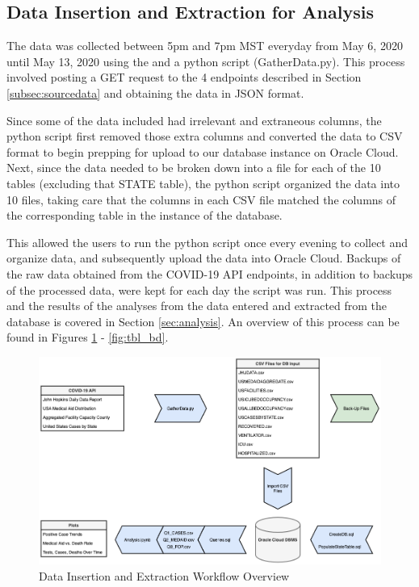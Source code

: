 \documentclass[11pt]{article}
\newcommand{\MYhref}[3][blue]{\href{#2}{\color{#1}{#3}}}%
\begin{document}
\subsection{Data Insertion and Extraction for Analysis}
\label{subsec:insertextract}

\noindent
The data was collected between 5pm and 7pm MST everyday from May 6, 2020 until May 13, 2020 using the \MYhref{https://www.npmjs.com/package/covid19-api}{Covid-19 API} and a python script (GatherData.py). This process involved posting a GET request to the 4 endpoints described in Section \ref{subsec:sourcedata} and obtaining the data in JSON format. 

\noindent
Since some of the data included had irrelevant and extraneous columns, the python script first removed those extra columns and converted the data to CSV format to begin prepping for upload to our database instance on Oracle Cloud. Next, since the data needed to be broken down into a file for each of the 10 tables (excluding that STATE table), the python script organized the data into 10 files, taking care that the columns in each CSV file matched the columns of the corresponding table in the instance of the database.

\noindent
This allowed the users to run the python script once every evening to collect and organize data, and subsequently upload the data into Oracle Cloud. Backups of the raw data obtained from the COVID-19 API endpoints, in addition to backups of the processed data, were kept for each day the script was run. This process and the results of the analyses from the data entered and extracted from the database is covered in Section \ref{sec:analysis}. An overview of this process can be found in Figures \ref{fig:my_label} - \ref{fig:tbl_bd}.

\FloatBarrier
\begin{figure}[h]
    \centering
    \includegraphics[width=\textwidth]{diagrams/DataInsertionExtraction.png}
    \caption{Data Insertion and Extraction Workflow Overview}
    \label{fig:my_label}
\end{figure}
\FloatBarrier
\end{document}
